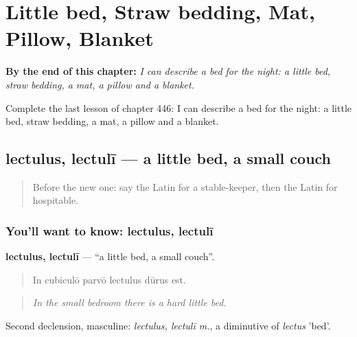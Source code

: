 
\chapter{Little bed, Straw bedding, Mat, Pillow, Blanket}
\label{ch:la-little-bed-straw-bedding-mat-pillow-blanket}

\begin{chapteropening}
\textbf{By the end of this chapter:} \emph{I can describe a bed for the night: a little bed, straw bedding, a mat, a pillow and a blanket.}

Complete the last lesson of chapter 446: I can describe a bed for the night: a little bed, straw bedding, a mat, a pillow and a blanket.
\end{chapteropening}

\section[lectulus, lectulī]{lectulus, lectulī — a little bed, a small couch}

\label{lesson:LA-C446-lectulus}



\begin{quote}
Before the new one: say the Latin for a stable-keeper, then the Latin for hospitable.
\end{quote}

\subsection*{You'll want to know: lectulus, lectulī}
\textbf{lectulus, lectulī} — \textquotedblleft{}a little bed, a small couch\textquotedblright{}.

\begin{quote}
In cubiculō parvō lectulus dūrus est.
\end{quote}

\begin{quote}
\emph{In the small bedroom there is a hard little bed.}
\end{quote}

Second declension, masculine: \emph{lectulus, lectulī m.}, a diminutive of \emph{lectus} 'bed'.

